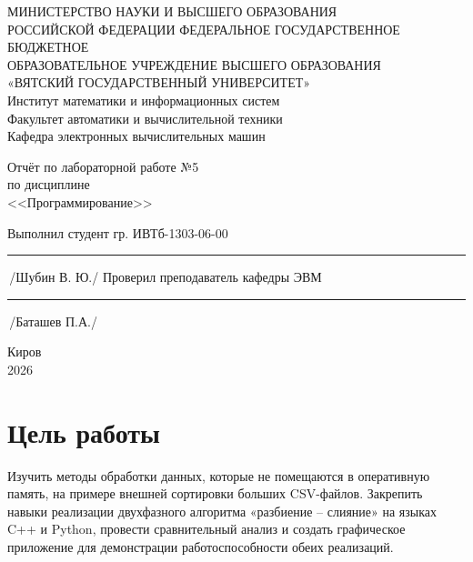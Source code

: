 \documentclass[oneside,a4paper,14pt]{extarticle}
\begin{document}
\newpage
\thispagestyle{empty}
\begin{center}
	МИНИСТЕРСТВО НАУКИ И ВЫСШЕГО ОБРАЗОВАНИЯ\\
	РОССИЙСКОЙ ФЕДЕРАЦИИ
	ФЕДЕРАЛЬНОЕ ГОСУДАРСТВЕННОЕ БЮДЖЕТНОЕ\\
	ОБРАЗОВАТЕЛЬНОЕ
	УЧРЕЖДЕНИЕ ВЫСШЕГО ОБРАЗОВАНИЯ\\
	«ВЯТСКИЙ ГОСУДАРСТВЕННЫЙ УНИВЕРСИТЕТ»\\
	Институт математики и информационных систем\\
	Факультет автоматики и вычислительной техники\\
	Кафедра электронных вычислительных машин
\end{center}

\vspace{20mm}

\begin{center}
	Отчёт по лабораторной работе №5\\
	по дисциплине\\
	<<Программирование>>
\end{center}

\vspace{48mm}

\noindent
Выполнил студент гр. ИВТб-1303-06-00 \hfill \rule[-0,5mm]{30mm}{0.15mm}\,/Шубин В. Ю./
\newline
Проверил преподаватель кафедры ЭВМ \hfill \rule[-0,5mm]{30mm}{0.15mm}\,/Баташев П.А./

\vfill

\begin{center}
	Киров\\
	2026
\end{center}

\newpage
\thispagestyle{empty}

\section*{Цель работы}
Изучить методы обработки данных, которые не помещаются в оперативную память, на примере внешней сортировки больших CSV-файлов. Закрепить навыки реализации двухфазного алгоритма «разбиение -- слияние» на языках C++ и Python, провести сравнительный анализ и создать графическое приложение для демонстрации работоспособности обеих реализаций.
\end{document}
